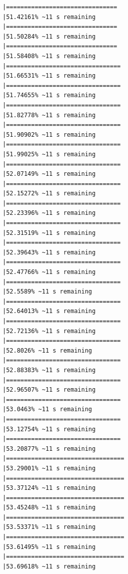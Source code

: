\documentclass{article}\usepackage[]{graphicx}\usepackage[]{xcolor}
\makeatletter
\newenvironment{kframe}{%
 \def\at@end@of@kframe{}%
 \ifinner\ifhmode%
  \def\at@end@of@kframe{\end{minipage}}%
  \begin{minipage}{\columnwidth}%
 \fi\fi%
 \def\FrameCommand##1{\hskip\@totalleftmargin \hskip-\fboxsep
 \colorbox{shadecolor}{##1}\hskip-\fboxsep
     \hskip-\linewidth \hskip-\@totalleftmargin \hskip\columnwidth}%
 \MakeFramed {\advance\hsize-\width
   \@totalleftmargin\z@ \linewidth\hsize
   \@setminipage}}%
 {\par\unskip\endMakeFramed%
 \at@end@of@kframe}
\newenvironment{knitrout}{}{} %
\makeatother
\begin{document}
\begin{knitrout}
\begin{kframe}
\begin{verbatim}
|===============================                               |51.42161% ~11 s remaining 
|===============================                               |51.50284% ~11 s remaining 
|===============================                               |51.58408% ~11 s remaining 
|================================                              |51.66531% ~11 s remaining 
|================================                              |51.74655% ~11 s remaining 
|================================                              |51.82778% ~11 s remaining 
|================================                              |51.90902% ~11 s remaining 
|================================                              |51.99025% ~11 s remaining 
|================================                              |52.07149% ~11 s remaining 
|================================                              |52.15272% ~11 s remaining 
|================================                              |52.23396% ~11 s remaining 
|================================                              |52.31519% ~11 s remaining 
|================================                              |52.39643% ~11 s remaining 
|================================                              |52.47766% ~11 s remaining 
|================================                              |52.5589% ~11 s remaining  
|================================                              |52.64013% ~11 s remaining 
|================================                              |52.72136% ~11 s remaining 
|================================                              |52.8026% ~11 s remaining  
|================================                              |52.88383% ~11 s remaining 
|================================                              |52.96507% ~11 s remaining 
|================================                              |53.0463% ~11 s remaining  
|================================                              |53.12754% ~11 s remaining 
|================================                              |53.20877% ~11 s remaining 
|=================================                             |53.29001% ~11 s remaining 
|=================================                             |53.37124% ~11 s remaining 
|=================================                             |53.45248% ~11 s remaining 
|=================================                             |53.53371% ~11 s remaining 
|=================================                             |53.61495% ~11 s remaining 
|=================================                             |53.69618% ~11 s remaining 

\end{verbatim}
\end{kframe}
\end{knitrout}
\end{document}
